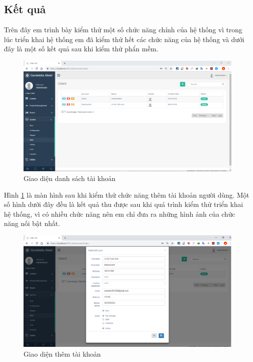 \subsection{Kết quả}
Trên đây em trình bày kiểm thử một số chức năng chính của hệ thống vì trong lúc triển khai hệ thống em đã kiểm thử hết các chức năng của hệ thống và dưới đây là một số kết quả sau khi kiểm thử phẩn mềm.
 \begin{center}
    \begin{figure}[h]
    \begin{center}
     \includegraphics[scale=0.45]{image/danhsachTK}
    \end{center}
    \caption{Giao diện danh sách tài khoản}
    \label{refhinh4_2}
    \end{figure}
\end{center}
\par
Hình \ref{refhinh4_2} là màn hình sau khi kiểm thử chức năng thêm tài khoản người dùng. Một số hình dưới đây đều là kết quả thu được sau khi quá trình kiểm thử triển khai hệ thống, vì có nhiều chức năng nên em chỉ đưa ra những hình ảnh của chức năng nối bật nhất.
 \begin{center}
    \begin{figure}[h]
    \begin{center}
     \includegraphics[scale=0.45]{image/themTK}
    \end{center}
    \caption{Giao diện thêm tài khoản}
    \label{refhinh4_3}
    \end{figure}
\end{center}

